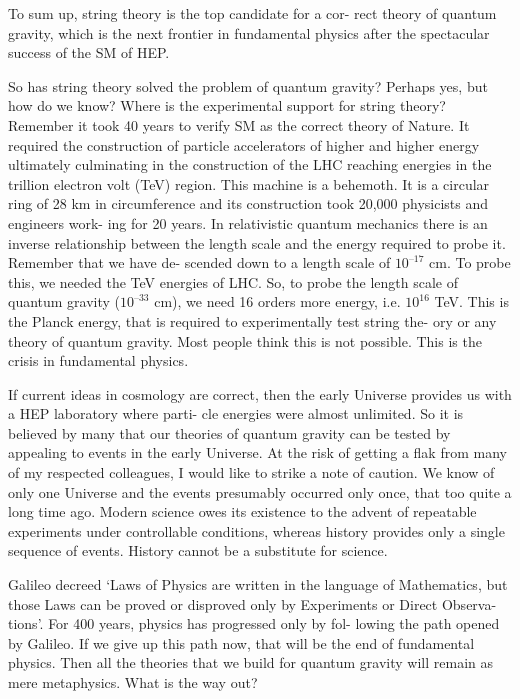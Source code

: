To sum up, string theory is the top candidate for a cor-
rect theory of quantum gravity, which is the next frontier
in fundamental physics after the spectacular success of
the SM of HEP.

So has string theory solved the problem of quantum
gravity? Perhaps yes, but how do we know? Where is the
experimental support for string theory? Remember it took
40 years to verify SM as the correct theory of Nature. It
required the construction of particle accelerators of
higher and higher energy ultimately culminating in the
construction of the LHC reaching energies in the trillion
electron volt (TeV) region. This machine is a behemoth.
It is a circular ring of 28 km in circumference and its
construction took 20,000 physicists and engineers work-
ing for 20 years. In relativistic quantum mechanics there
is an inverse relationship between the length scale and the
energy required to probe it. Remember that we have de-
scended down to a length scale of $10^{–17}$ cm. To probe
this, we needed the TeV energies of LHC. So, to probe
the length scale of quantum gravity ($10^{–33}$ cm), we need
16 orders more energy, i.e. $10^{16}$ TeV. This is the Planck
energy, that is required to experimentally test string the-
ory or any theory of quantum gravity. Most people think
this is not possible. This is the crisis in fundamental
physics.

If current ideas in cosmology are correct, then the early
Universe provides us with a HEP laboratory where parti-
cle energies were almost unlimited. So it is believed by
many that our theories of quantum gravity can be tested
by appealing to events in the early Universe. At the risk
of getting a flak from many of my respected colleagues, I
would like to strike a note of caution. We know of only
one Universe and the events presumably occurred only
once, that too quite a long time ago. Modern science
owes its existence to the advent of repeatable experiments
under controllable conditions, whereas history provides
only a single sequence of events. History cannot be a
substitute for science.

Galileo decreed ‘Laws of Physics are written in the
language of Mathematics, but those Laws can be proved
or disproved only by Experiments or Direct Observa-
tions’. For 400 years, physics has progressed only by fol-
lowing the path opened by Galileo. If we give up this
path now, that will be the end of fundamental physics.
Then all the theories that we build for quantum gravity
will remain as mere metaphysics. What is the way out?

